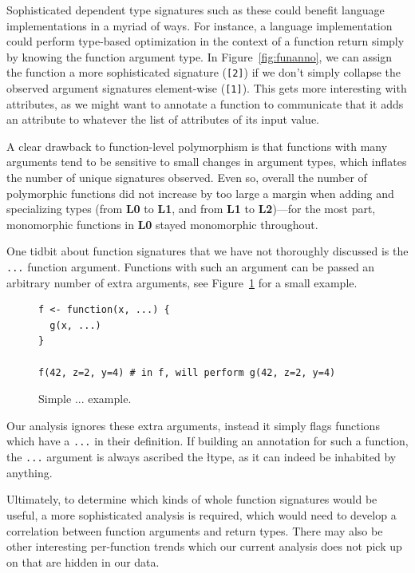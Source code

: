 \documentclass[acmsmall,10pt,review,anonymous]{acmart}\settopmatter{printfolios=true,printccs=false,printacmref=false}
\begin{document}
Sophisticated dependent type signatures such as these could benefit language implementations in a myriad of ways.
For instance, a language implementation could perform type-based optimization in the context of a function return simply by knowing the function argument type.
In Figure~\ref{fig:funanno}, we can assign the function a more sophisticated signature ({\tt [2]}) if we don't simply collapse the observed argument signatures element-wise ({\tt [1]}).
This gets more interesting with attributes, as we might want to annotate a function to communicate that it adds an attribute to whatever the list of attributes of its input value.

A clear drawback to function-level polymorphism is that functions with many arguments tend to be sensitive to small changes in argument types, which inflates the number of unique signatures observed.
Even so, overall the number of polymorphic functions did not increase by too large a margin when adding and specializing types (from {\bf L0} to {\bf L1}, and from {\bf L1} to {\bf L2})---for the most part, monomorphic functions in {\bf L0} stayed monomorphic throughout.

One tidbit about function signatures that we have not thoroughly discussed is the {\tt ...} function argument.
Functions with such an argument can be passed an arbitrary number of extra arguments, see Figure~\ref{fig:dotdotdot} for a small example.

\begin{figure}[!hb]{\small\begin{lstlisting}[style=R]
f <- function(x, ...) {
  g(x, ...)
}

f(42, z=2, y=4) # in f, will perform g(42, z=2, y=4)

\end{lstlisting}}\caption{Simple ... example.}\label{fig:dotdotdot}\end{figure}

Our analysis ignores these extra arguments, instead it simply flags functions which have a {\tt ...} in their definition.
If building an annotation for such a function, the {\tt ...} argument is always ascribed the \l type, as it can indeed be inhabited by anything.

Ultimately, to determine which kinds of whole function signatures would be useful, a more sophisticated analysis is required, which would need to develop a correlation between function arguments and return types.
There may also be other interesting per-function trends which our current analysis does not pick up on that are hidden in our data.
\end{document}
